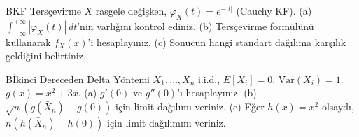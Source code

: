 \begin{alistirma}[Al.6.10]{B}{KF Tersçevirme}
$X$ rasgele değişken, $\varphi_X(t) = e^{-|t|}$ (Cauchy KF).
(a) $\int_{-\infty}^{+\infty} |\varphi_X(t)|\,dt$'nin varlığını kontrol ediniz.
(b) Tersçevirme formülünü kullanarak $f_X(x)$'i hesaplayınız.
(c) Sonucun hangi standart dağılıma karşılık geldiğini belirtiniz.
\end{alistirma}

\begin{alistirma}[Al.6.11]{B}{İkinci Dereceden Delta Yöntemi}
$X_1, \ldots, X_n$ i.i.d., $E[X_i] = 0$, $\mathrm{Var}(X_i) = 1$.
$g(x) = x^2 + 3x$.
(a) $g'(0)$ ve $g''(0)$'ı hesaplayınız.
(b) $\sqrt{n}(g(\bar{X}_n) - g(0))$ için limit dağılımı veriniz.
(c) Eğer $h(x) = x^2$ olsaydı, $n(h(\bar{X}_n) - h(0))$ için limit dağılımını veriniz.
\end{alistirma}

\endinput
